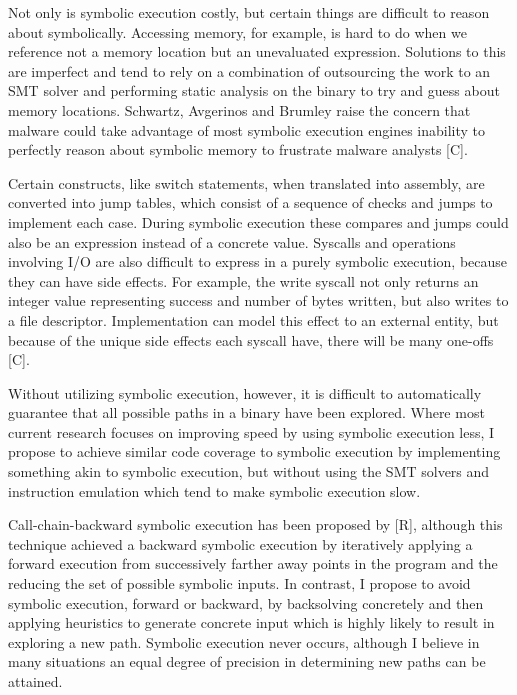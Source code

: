 \documentclass[11pt,expanded,copyright]{fsuthesis}
\begin{document}
Not only is symbolic execution costly, but certain things are difficult to reason about symbolically. Accessing memory, for example, is hard to do when we reference not a memory location but an unevaluated expression. Solutions to this are imperfect and tend to rely on a combination of outsourcing the work to an SMT solver and performing static analysis on the binary to try and guess about memory locations. Schwartz, Avgerinos and Brumley raise the concern that malware could take advantage of most symbolic execution engines inability to perfectly reason about symbolic memory to frustrate malware analysts [C].

Certain constructs, like switch statements, when translated into assembly, are converted into jump tables, which consist of a sequence of checks and jumps to implement each case. During symbolic execution these compares and jumps could also be an expression instead of a concrete value. Syscalls and operations involving I/O are also difficult to express in a purely symbolic execution, because they can have side effects. For example, the write syscall not only returns an integer value representing success and number of bytes written, but also writes to a file descriptor. Implementation can model this effect to an external entity, but because of the unique side effects each syscall have, there will be many one-offs [C]. 

Without utilizing symbolic execution, however, it is difficult to automatically guarantee that all possible paths in a binary have been explored. Where most current research focuses on improving speed by using symbolic execution less, I propose to achieve similar code coverage to symbolic execution by implementing something akin to symbolic execution, but without using the SMT solvers and instruction emulation which tend to make symbolic execution slow.

Call-chain-backward symbolic execution has been proposed by [R], although this technique achieved a backward symbolic execution by iteratively applying a forward execution from successively farther away points in the program and the reducing the set of possible symbolic inputs. In contrast, I propose to avoid symbolic execution, forward or backward, by backsolving concretely and then applying heuristics to generate concrete input which is highly likely to result in exploring a new path. Symbolic execution never occurs, although I believe in many situations an equal degree of precision in determining new paths can be attained.
\end{document}
